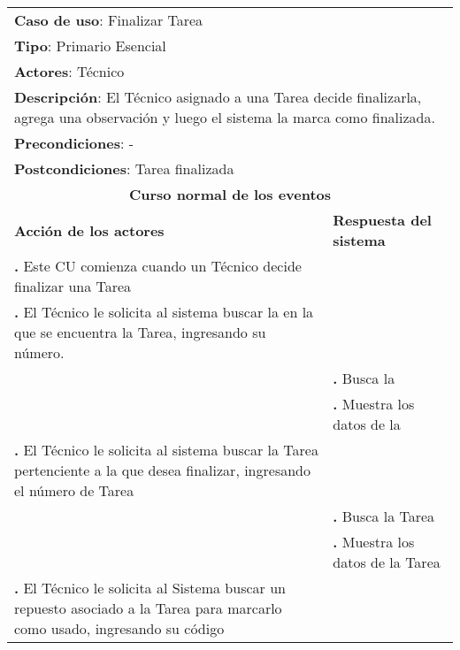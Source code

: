 \documentclass[12pt]{extarticle}
\begin{document}
    \newcommand\inc{\stepcounter{step}\textbf{\thestep. }}
    \newcommand\resetinc{\setcounter{step}{0}}
    \newcommand\raya{\noindent\rule{169mm}{0.8mm}\\}


	\begin{longtable}{ |p{8cm}|p{8cm}| }
		\hline
		\multicolumn{2}{|p{16cm}|}{\textbf{Caso de uso}: Finalizar Tarea}\\
		\multicolumn{2}{|p{16cm}|}{\textbf{Tipo}: Primario Esencial}\\
		\multicolumn{2}{|p{16cm}|}{\textbf{Actores}: Técnico}\\
		\multicolumn{2}{|p{16cm}|}{\textbf{Descripción}: El Técnico asignado a una Tarea decide finalizarla, agrega una observación y luego el sistema la marca como finalizada.}\\
		\multicolumn{2}{|p{16cm}|}{\textbf{Precondiciones}: -}\\
		\multicolumn{2}{|p{16cm}|}{\textbf{Postcondiciones}: Tarea finalizada}\\
		\hline
		\multicolumn{2}{|c|}{\textbf{Curso normal de los eventos}}\\
		\hline
		\textbf{Acción de los actores} & \textbf{Respuesta del sistema}\\
		\hline
            \inc Este CU comienza cuando un Técnico decide finalizar una Tarea& \\
            \hline
            \inc El Técnico le solicita al sistema buscar la \OT{} en la que se encuentra la Tarea, ingresando su número.& \\
            \hline
            & \inc Busca la \OT{}\\
            \hline
            & \inc Muestra los datos de la \OT{}\\
            \hline


            \inc El Técnico le solicita al sistema buscar la Tarea pertenciente a la \OT{} que desea finalizar, ingresando el número de Tarea& \\
            \hline
            & \inc Busca la Tarea\\
            \hline
            & \inc Muestra los datos de la Tarea\\
            \hline
            \inc El Técnico le solicita al Sistema buscar un repuesto asociado a la Tarea para marcarlo como usado, ingresando su código& \\
            \hline



\end{longtable}
\end{document}
